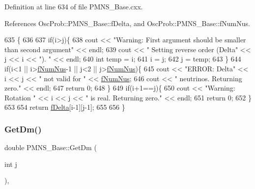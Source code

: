 Definition at line 634 of file P\+M\+N\+S\+\_\+\+Base.\+cxx.



References Osc\+Prob\+::\+P\+M\+N\+S\+\_\+\+Base\+::f\+Delta, and Osc\+Prob\+::\+P\+M\+N\+S\+\_\+\+Base\+::f\+Num\+Nus.


\begin{DoxyCode}
635 \{
636 
637   \textcolor{keywordflow}{if}(i>j)\{
638     cout << \textcolor{stringliteral}{"Warning: First argument should be smaller than second argument"} << endl;
639     cout << \textcolor{stringliteral}{"         Setting reverse order (Delta"} << j << i << \textcolor{stringliteral}{"). "} << endl;
640     \textcolor{keywordtype}{int} temp = i;
641     i = j;
642     j = temp;
643   \}
644   \textcolor{keywordflow}{if}(i<1 || i>\hyperlink{classOscProb_1_1PMNS__Base_a24bb74bed63569dfe88b18fa6a08060e}{fNumNus}-1 || j<2 || j>\hyperlink{classOscProb_1_1PMNS__Base_a24bb74bed63569dfe88b18fa6a08060e}{fNumNus})\{
645     cout << \textcolor{stringliteral}{"ERROR: Delta"} << i << j << \textcolor{stringliteral}{" not valid for "} << \hyperlink{classOscProb_1_1PMNS__Base_a24bb74bed63569dfe88b18fa6a08060e}{fNumNus};
646     cout << \textcolor{stringliteral}{" neutrinos. Returning zero."} << endl;
647     \textcolor{keywordflow}{return} 0;
648   \}
649   \textcolor{keywordflow}{if}(i+1==j)\{
650     cout << \textcolor{stringliteral}{"Warning: Rotation "} << i << j << \textcolor{stringliteral}{" is real. Returning zero."} << endl;
651     \textcolor{keywordflow}{return} 0;
652   \}
653 
654   \textcolor{keywordflow}{return} \hyperlink{classOscProb_1_1PMNS__Base_ab2a5fa40e689b221c8a7d2c17213810d}{fDelta}[i-1][j-1];
655 
656 \}
\end{DoxyCode}
\mbox{\label{classOscProb_1_1PMNS__Base_ad26815ac5f4805d1259817e4936e5f8f}} 
\subsubsection{\texorpdfstring{Get\+Dm()}{GetDm()}}
{\footnotesize\ttfamily double P\+M\+N\+S\+\_\+\+Base\+::\+Get\+Dm (\begin{DoxyParamCaption}\item[{int}]{j }\end{DoxyParamCaption})\hspace{0.3cm}{\ttfamily [virtual]}, {\ttfamily [inherited]}}

